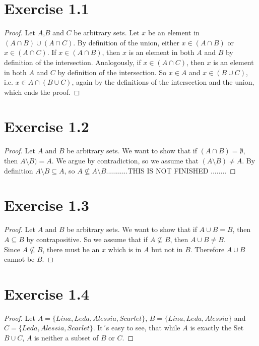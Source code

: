 \documentclass{article} %
\newcommand{\homeworkNumber}{1}
\begin{document}
\section*{Exercise \homeworkNumber.1}

\begin{proof}
Let $A$,$B$ and $C$ be arbitrary sets. Let $x$ be an element in $(A \cap B) \cup (A \cap C)$. By definition of the union, either $x \in (A \cap B)$ or $ x \in (A \cap C)$. If $x \in (A \cap B)$, then $x$ is an element in both $A$ and $B$ by definition of the intersection. Analogously, if $x \in (A \cap C)$, then $x$ is an element in both $A$ and $C$ by definition of the intersection. So $x \in A$ and $x \in (B \cup C)$, i.e. $x \in A \cap (B \cup C) $, again by the definitions of the intersection and the union, which ends the proof.

\end{proof}

\section*{Exercise \homeworkNumber.2}

\begin{proof}
Let $A$ and $B$ be arbitrary sets. We want to show that if $(A \cap B) = \emptyset$, then $A \setminus B) = A$. We argue by contradiction, so we assume that $(A \setminus B) \neq A$.
By definition $A \setminus B \subseteq A$, so $A 	\not\subseteq A \setminus B$...........THIS IS NOT FINISHED ........ 


\end{proof}


\section*{Exercise \homeworkNumber.3}

\begin{proof}
Let $A$ and $B$ be arbitrary sets. We want to show that if $A \cup B = B$, then $A \subseteq B$ by contrapositive. So we assume that if $A \not\subseteq B$, then $A \cup B \neq B$.\\
Since $A \not\subseteq B$, there must be an $x$ which is in $A$ but not in $B$. Therefore $A \cup B$ cannot be $B$.


\end{proof}

\section*{Exercise \homeworkNumber.4}

\begin{proof}
Let $A = \{Lina, Leda, Alessia, Scarlet\}$, $B = \{Lina, Leda, Alessia\}$ and \linebreak $C  = \{Leda, Alessia, Scarlet\}$. It´s easy to see, that while $A$ is exactly the Set $B \cup C$, $A$ is neither a subset of $B$ or $C$.

 
\end{proof}
\end{document}
